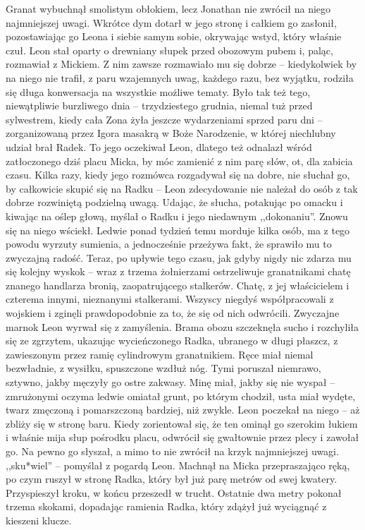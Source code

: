 \documentclass[../MAIN.tex]{subfiles}
\begin{document}
Granat wybuchnął smolistym obłokiem, lecz Jonathan nie zwrócił na niego najmniejszej uwagi. Wkrótce dym dotarł w jego stronę i całkiem go zasłonił, pozostawiając go Leona i siebie samym sobie, okrywając wstyd, który właśnie czuł.
%
%
Leon stał oparty o drewniany słupek przed obozowym pubem i, paląc, rozmawiał z Mickiem. Z nim zawsze rozmawiało mu się dobrze -- kiedykolwiek by na niego nie trafił, z paru wzajemnych uwag, każdego razu, bez wyjątku, rodziła się długa konwersacja na wszystkie możliwe tematy. Było tak też tego, niewątpliwie burzliwego dnia -- trzydziestego grudnia, niemal tuż przed sylwestrem, kiedy cała Zona żyła jeszcze wydarzeniami sprzed paru dni -- zorganizowaną przez Igora masakrą w Boże Narodzenie, w której niechlubny udział brał Radek.
To jego oczekiwał Leon, dlatego też odnalazł wśród zatłoczonego dziś placu Micka, by móc zamienić z nim parę słów, ot, dla zabicia czasu. Kilka razy, kiedy jego rozmówca rozgadywał się na dobre, nie słuchał go, by całkowicie skupić się na Radku -- Leon zdecydowanie nie należał do osób z tak dobrze rozwiniętą podzielną uwagą. Udając, że słucha, potakując po omacku i kiwając na oślep głową, myślał o Radku i jego niedawnym ,,dokonaniu''. Znowu się na niego wściekł.
Ledwie ponad tydzień temu morduje kilka osób, ma z tego powodu wyrzuty sumienia, a jednocześnie przeżywa fakt, że sprawiło mu to zwyczajną radość. Teraz, po upływie tego czasu, jak gdyby nigdy nic zdarza mu się kolejny wyskok -- wraz z trzema żołnierzami ostrzeliwuje granatnikami chatę znanego handlarza bronią, zaopatrującego stalkerów. Chatę, z jej właścicielem i czterema innymi, nieznanymi stalkerami. Wszyscy niegdyś współpracowali z wojskiem i zginęli prawdopodobnie za to, że się od nich odwrócili. Zwyczajne marno\3k
Leon wyrwał się z zamyślenia. Brama obozu szczeknęła sucho i rozchyliła się ze zgrzytem, ukazując wycieńczonego Radka, ubranego w długi płaszcz, z zawieszonym przez ramię cylindrowym granatnikiem. Ręce miał niemal bezwładnie, z wysiłku, spuszczone wzdłuż nóg. Tymi poruszał niemrawo, sztywno, jakby męczyły go ostre zakwasy. Minę miał, jakby się nie wyspał -- zmrużonymi oczyma ledwie omiatał grunt, po którym chodził, usta miał wydęte, twarz zmęczoną i pomarszczoną bardziej, niż zwykle.
Leon poczekał na niego -- aż zbliży się w stronę baru. Kiedy zorientował się, że ten ominął go szerokim łukiem i właśnie mija słup pośrodku placu, odwrócił się gwałtownie przez plecy i zawołał go.
Na pewno go słyszał, a mimo to nie zwrócił na krzyk najmniejszej uwagi.
,,sku*wiel'' -- pomyślał z pogardą Leon. Machnął na Micka przepraszająco ręką, po czym ruszył w stronę Radka, który był już parę metrów od swej kwatery. Przyspieszył kroku, w końcu przeszedł w trucht. Ostatnie dwa metry pokonał trzema skokami, dopadając ramienia Radka, który zdążył już wyciągnąć z kieszeni klucze.
\end{document}
